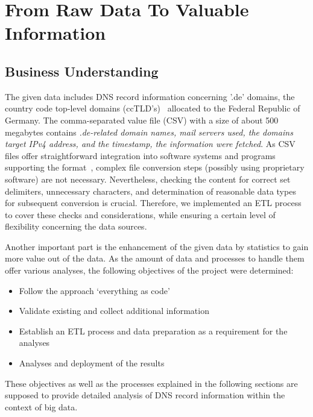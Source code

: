 \section{From Raw Data To Valuable Information}\label{sec:from-raw-data-to-valuable-information}

\subsection{Business Understanding}\label{subsec:businessunderstanding}
The given data includes DNS record information concerning '.de' domains, the country code top-level domains (ccTLD's)~\autocite[cf.][]{DENICeG.2021} allocated to the Federal Republic of Germany.
The comma-separated value file (CSV) with a size of about 500 megabytes contains \textit{.de-related domain names, mail servers used, the domains target IPv4 address, and the timestamp, the information were fetched}.
As CSV files offer straightforward integration into software systems and programs supporting the format~\autocite[cf.][]{Hoffman.2018}, complex file conversion steps (possibly using proprietary software) are not necessary.
Nevertheless, checking the content for correct set delimiters, unnecessary characters, and determination of reasonable data types for subsequent conversion is crucial.
Therefore, we implemented an ETL process to cover these checks and considerations, while ensuring a certain level of flexibility concerning the data sources.

Another important part is the enhancement of the given data by statistics to gain more value out of the data.
As the amount of data and processes to handle them offer various analyses, the following objectives of the project were determined:
\begin{itemize}
    \item Follow the approach ‘everything as code’
    \item Validate existing and collect additional information
    \item Establish an ETL process and data preparation as a requirement for the analyses
    \item Analyses and deployment of the results
\end{itemize}
These objectives as well as the processes explained in the following sections are supposed to provide detailed analysis of DNS record information within the context of big data.



